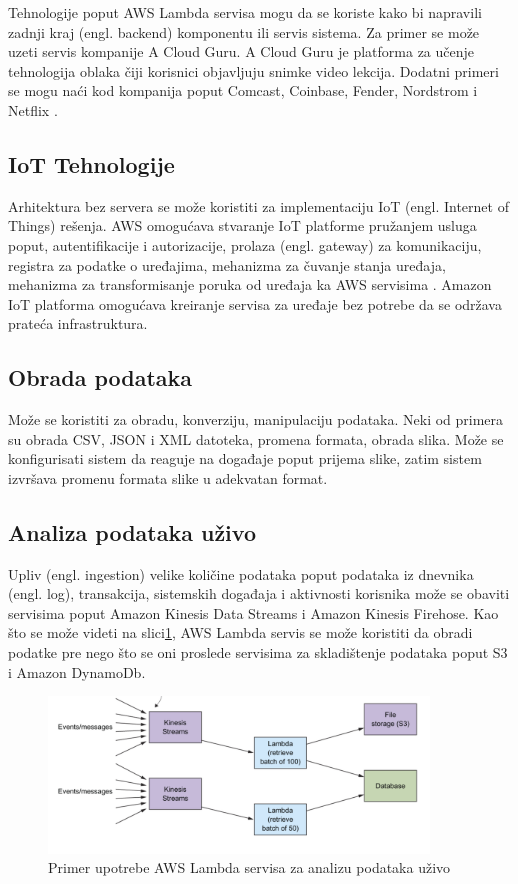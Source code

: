 \documentclass[12pt,oneside]{memoir}
\begin{document}
Tehnologije poput AWS Lambda servisa mogu da se koriste kako bi napravili zadnji kraj (engl. backend) komponentu ili servis sistema. Za primer se može uzeti servis kompanije A Cloud Guru. A Cloud Guru je platforma za učenje tehnologija oblaka čiji korisnici objavljuju snimke video lekcija. Dodatni primeri se mogu naći kod kompanija poput Comcast, Coinbase, Fender, Nordstrom i Netflix \cite{ascs}.

\subsection{IoT Tehnologije}

Arhitektura bez servera se može koristiti za implementaciju IoT (engl. Internet of Things) rešenja. AWS omogućava stvaranje IoT platforme pružanjem usluga poput, autentifikacije i autorizacije, prolaza (engl. gateway) za komunikaciju, registra za podatke o uređajima, mehanizma za čuvanje stanja uređaja, mehanizma za transformisanje poruka od uređaja ka AWS servisima \cite{aicf}. Amazon IoT platforma omogućava kreiranje servisa za uređaje bez potrebe da se održava prateća infrastruktura.

\subsection{Obrada podataka}
Može se koristiti za obradu, konverziju, manipulaciju podataka. Neki od primera su obrada CSV, JSON i XML datoteka, promena formata, obrada slika. Može se konfigurisati sistem da reaguje na događaje poput prijema slike, zatim sistem izvršava promenu formata slike u adekvatan format.

\subsection{Analiza podataka uživo}
Upliv (engl. ingestion) velike količine podataka poput podataka iz dnevnika (engl. log), transakcija, sistemskih događaja i aktivnosti korisnika može se obaviti servisima poput Amazon Kinesis Data Streams i Amazon Kinesis Firehose. Kao što se može videti na slici\ref{fig:AnalizaPodataka}, AWS Lambda servis se može koristiti da obradi podatke pre nego što se oni proslede servisima za skladištenje podataka poput S3 i Amazon DynamoDb.

\begin{figure}[!ht]
  \centering
  \includegraphics[width=0.9\textwidth]{Slika 8.png}
  \caption{Primer upotrebe AWS Lambda servisa za analizu podataka uživo}
  \label{fig:AnalizaPodataka}
\end{figure}
\end{document}
